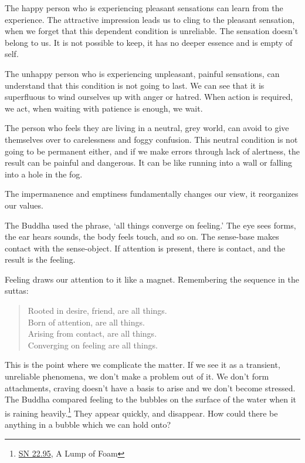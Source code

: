 The happy person who is experiencing pleasant sensations can learn from
the experience. The attractive impression leads us to cling to the
pleasant sensation, when we forget that this dependent condition is
unreliable. The sensation doesn't belong to us. It is not possible to
keep, it has no deeper essence and is empty of self.

The unhappy person who is experiencing unpleasant, painful sensations,
can understand that this condition is not going to last. We can see that
it is superfluous to wind ourselves up with anger or hatred. When action
is required, we act, when waiting with patience is enough, we wait.

The person who feels they are living in a neutral, grey world, can avoid
to give themselves over to carelessness and foggy confusion. This
neutral condition is not going to be permanent either, and if we make
errors through lack of alertness, the result can be painful and
dangerous. It can be like running into a wall or falling into a hole in
the fog.

The impermanence and emptiness fundamentally changes our view, it
reorganizes our values.

The Buddha used the phrase, `all things converge on feeling.' The eye
sees forms, the ear hears sounds, the body feels touch, and so on. The
sense-base makes contact with the sense-object. If attention is present,
there is contact, and the result is the feeling.

Feeling draws our attention to it like a magnet. Remembering the
sequence in the suttas:

\begin{quote}
Rooted in desire, friend, are all things.\\
Born of attention, are all things.\\
Arising from contact, are all things.\\
Converging on feeling are all things.

\bigskip

\end{quote}


This is the point where we complicate the matter. If we see it as a
transient, unreliable phenomena, we don't make a problem out of it. We
don't form attachments, craving doesn't have a basis to arise and we
don't become stressed. The Buddha compared feeling to the bubbles on the
surface of the water when it is raining heavily.\footnote{\href{https://suttacentral.net/sn22.95}{SN
  22.95}, A Lump of Foam} They appear quickly, and disappear. How could
there be anything in a bubble which we can hold onto?

